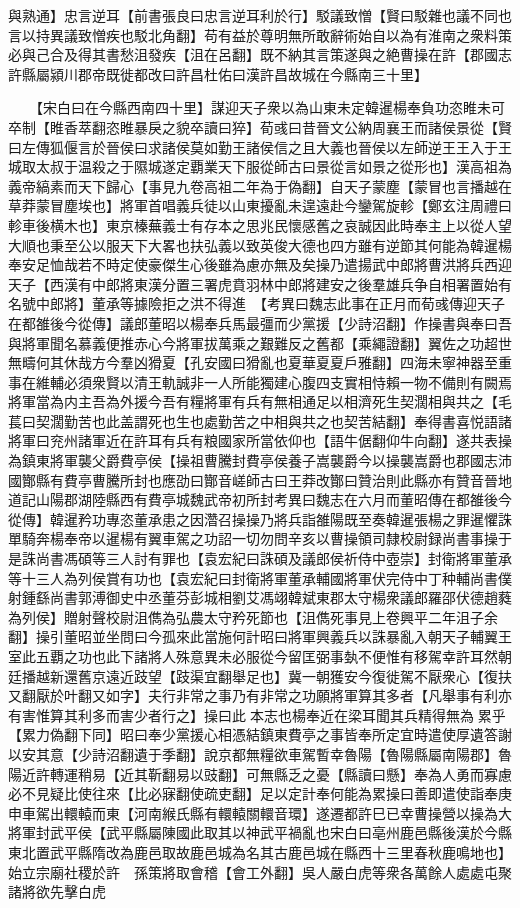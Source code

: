 與熟通】忠言逆耳【前書張良曰忠言逆耳利於行】駁議致憎【賢曰駁雜也議不同也言以持異議致憎疾也駁北角翻】苟有益於尊明無所敢辭術始自以為有淮南之衆料策必與己合及得其書愁沮發疾【沮在呂翻】既不納其言策遂與之絶曹操在許【郡國志許縣屬潁川郡帝既徙都改曰許昌杜佑曰漢許昌故城在今縣南三十里】

　　【宋白曰在今縣西南四十里】謀迎天子衆以為山東未定韓暹楊奉負功恣睢未可卒制【睢香萃翻恣睢暴戾之貌卒讀曰猝】荀彧曰昔晉文公納周襄王而諸侯景從【賢曰左傳狐偃言於晉侯曰求諸侯莫如勤王諸侯信之且大義也晉侯以左師逆王王入于王城取太叔于温殺之于隰城遂定覇業天下服從師古曰景從言如景之從形也】漢高祖為義帝縞素而天下歸心【事見九卷高祖二年為于偽翻】自天子蒙塵【蒙冒也言播越在草莽蒙冒塵埃也】將軍首唱義兵徒以山東擾亂未遑遠赴今鑾駕旋軫【鄭玄注周禮曰軫車後横木也】東京榛蕪義士有存本之思兆民懷感舊之哀誠因此時奉主上以從人望大順也秉至公以服天下大畧也扶弘義以致英俊大德也四方雖有逆節其何能為韓暹楊奉安足恤哉若不時定使豪傑生心後雖為慮亦無及矣操乃遣揚武中郎將曹洪將兵西迎天子【西漢有中郎將東漢分置三署虎賁羽林中郎將建安之後羣雄兵争自相署置始有名號中郎將】董承等據險拒之洪不得進　【考異曰魏志此事在正月而荀彧傳迎天子在都雒後今從傳】議郎董昭以楊奉兵馬最彊而少黨援【少詩沼翻】作操書與奉曰吾與將軍聞名慕義便推赤心今將軍拔萬乘之艱難反之舊都【乘繩證翻】翼佐之功超世無疇何其休哉方今羣凶猾夏【孔安國曰猾亂也夏華夏夏戶雅翻】四海未寧神器至重事在維輔必須衆賢以清王軌誠非一人所能獨建心腹四支實相恃賴一物不備則有闕焉將軍當為内主吾為外援今吾有糧將軍有兵有無相通足以相濟死生契濶相與共之【毛萇曰契濶勤苦也此盖謂死也生也處勤苦之中相與共之也契苦結翻】奉得書喜悦語諸將軍曰兖州諸軍近在許耳有兵有粮國家所當依仰也【語牛倨翻仰牛向翻】遂共表操為鎮東將軍襲父爵費亭侯【操祖曹騰封費亭侯養子嵩襲爵今以操襲嵩爵也郡國志沛國酇縣有費亭曹騰所封也應劭曰酇音嵯師古曰王莽改酇曰贊治則此縣亦有贊音晉地道記山陽郡湖陸縣西有費亭城魏武帝初所封考異曰魏志在六月而董昭傳在都雒後今從傳】韓暹矜功專恣董承患之因濳召操操乃將兵詣雒陽既至奏韓暹張楊之罪暹懼誅單騎奔楊奉帝以暹楊有翼車駕之功詔一切勿問辛亥以曹操領司隸校尉録尚書事操于是誅尚書馮碩等三人討有罪也【袁宏紀曰誅碩及議郎侯祈侍中壺崇】封衛將軍董承等十三人為列侯賞有功也【袁宏紀曰封衛將軍董承輔國將軍伏完侍中丁种輔尚書僕射鍾繇尚書郭溥御史中丞董芬彭城相劉艾馮翊韓斌東郡太守楊衆議郎羅邵伏德趙蕤為列侯】贈射聲校尉沮儁為弘農太守矜死節也【沮儁死事見上卷興平二年沮子余翻】操引董昭並坐問曰今孤來此當施何計昭曰將軍興義兵以誅暴亂入朝天子輔翼王室此五覇之功也此下諸將人殊意異未必服從今留匡弼事埶不便惟有移駕幸許耳然朝廷播越新還舊京遠近跂望【跂渠宜翻舉足也】冀一朝獲安今復徙駕不厭衆心【復扶又翻厭於叶翻又如字】夫行非常之事乃有非常之功願將軍算其多者【凡舉事有利亦有害惟算其利多而害少者行之】操曰此本志也楊奉近在梁耳聞其兵精得無為累乎【累力偽翻下同】昭曰奉少黨援心相憑結鎮東費亭之事皆奉所定宜時遣使厚遺答謝以安其意【少詩沼翻遺于季翻】說京都無糧欲車駕暫幸魯陽【魯陽縣屬南陽郡】魯陽近許轉運稍易【近其靳翻易以豉翻】可無縣乏之憂【縣讀曰懸】奉為人勇而寡慮必不見疑比使往來【比必寐翻使疏吏翻】足以定計奉何能為累操曰善即遣使詣奉庚申車駕出轘轅而東【河南緱氏縣有轘轅關轘音環】遂遷都許巳已幸曹操營以操為大將軍封武平侯【武平縣屬陳國此取其以神武平禍亂也宋白曰亳州鹿邑縣後漢於今縣東北置武平縣隋改為鹿邑取故鹿邑城為名其古鹿邑城在縣西十三里春秋鹿鳴地也】始立宗廟社稷於許　孫策將取會稽【會工外翻】吳人嚴白虎等衆各萬餘人處處屯聚諸將欲先擊白虎